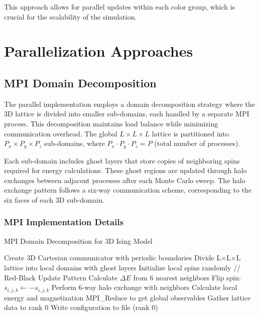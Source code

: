 \documentclass{article}
\begin{document}
This approach allows for parallel updates within each color group, which is crucial for the scalability of the simulation.

\section{Parallelization Approaches}
\subsection{MPI Domain Decomposition}
The parallel implementation employs a domain decomposition strategy where the 3D lattice is divided into smaller sub-domains, each handled by a separate MPI process. This decomposition maintains load balance while minimizing communication overhead. The global $L \times L \times L$ lattice is partitioned into $P_x \times P_y \times P_z$ sub-domains, where $P_x \cdot P_y \cdot P_z = P$ (total number of processes).

Each sub-domain includes ghost layers that store copies of neighboring spins required for energy calculations. These ghost regions are updated through halo exchanges between adjacent processes after each Monte Carlo sweep. The halo exchange pattern follows a six-way communication scheme, corresponding to the six faces of each 3D sub-domain.

\subsubsection{MPI Implementation Details}
\begin{algorithm}[H]
\caption{MPI Domain Decomposition for 3D Ising Model}
\begin{algorithmic}[1]
\State Create 3D Cartesian communicator with periodic boundaries
\State Divide L×L×L lattice into local domains with ghost layers
\State Initialize local spins randomly
    \State // Red-Black Update Pattern
            \State Calculate $\Delta E$ from 6 nearest neighbors
                \State Flip spin: $s_{i,j,k} \gets -s_{i,j,k}$
            \EndIf
        \EndFor
        \State Perform 6-way halo exchange with neighbors
    \EndFor
    \State Calculate local energy and magnetization
    \State MPI\_Reduce to get global observables
        \State Gather lattice data to rank 0
        \State Write configuration to file (rank 0)
    \EndIf
\EndFor
\end{algorithmic}
\end{algorithm}
\end{document}
